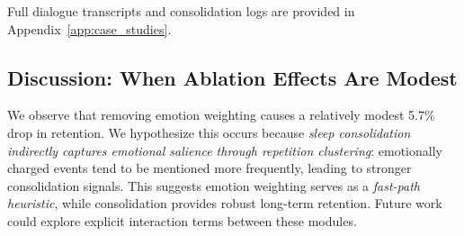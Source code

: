 Full dialogue transcripts and consolidation logs are provided in Appendix~\ref{app:case_studies}.

\subsection{Discussion: When Ablation Effects Are Modest}
\label{subsec:discussion}

We observe that removing emotion weighting causes a relatively modest 5.7\% drop in retention. We hypothesize this occurs because \textit{sleep consolidation indirectly captures emotional salience through repetition clustering}: emotionally charged events tend to be mentioned more frequently, leading to stronger consolidation signals. This suggests emotion weighting serves as a \textit{fast-path heuristic}, while consolidation provides robust long-term retention. Future work could explore explicit interaction terms between these modules.
